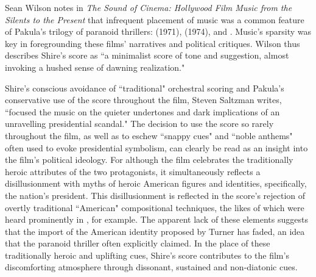 Sean Wilson notes in \textit{The Sound of Cinema: Hollywood Film Music from the Silents to the Present} that infrequent placement of music was a common feature of Pakula's trilogy of paranoid thrillers:  (1971),  (1974), and .
Music's sparsity was key in foregrounding these films' narratives and political critiques.
Wilson thus describes Shire's score as ``a minimalist score of tone and suggestion, almost invoking a hushed sense of dawning realization."\autocites[][119]{wilson_sound_2022}

Shire's conscious avoidance of ``traditional" orchestral scoring and Pakula's conservative use of the score throughout the film, Steven Saltzman writes, ``focused the music on the quieter undertones and dark implications of an unravelling presidential scandal."\autocites[][34]{saltzman_music_2015}
The decision to use the score so rarely throughout the film, as well as to eschew ``snappy cues" and ``noble anthems" often used to evoke presidential symbolism, can clearly be read as an insight into the film's political ideology.\autocites[][34]{saltzman_music_2015}
For although the film celebrates the traditionally heroic attributes of the two protagonists, it simultaneously reflects a disillusionment with myths of heroic American figures and identities, specifically, the nation's president.
This disillusionment is reflected in the score's rejection of overtly traditional ``American" compositional techniques, the likes of which were heard prominently in , for example.
The apparent lack of these elements suggests that the import of the American identity proposed by Turner has faded, an idea that the paranoid thriller often explicitly claimed.
In the place of these traditionally heroic and uplifting cues, Shire's score contributes to the film's discomforting atmosphere through dissonant, sustained and non-diatonic cues.

